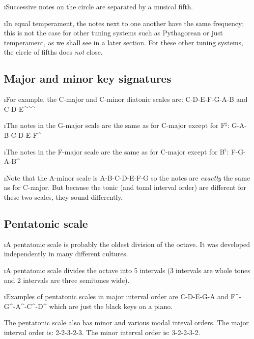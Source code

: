 \i Successive notes on the circle are separated by a musical fifth.

\i In equal temperament, the notes next to one another have the 
same frequency; 
this is not the case for other tuning systems such as Pythagorean
or just temperament, as we shall see in a later
section.
For these other tuning systems, the circle of fifths does {\em not}
close.

\ei
\subsection{Major and minor key signatures}
\bi

\i For example, the C-major and C-minor diatonic scales are:
\be
{\rm C-D-E-F-G-A-B}
\nonumber
\ee
% 
and
%
\be
{\rm C-D-E}^^^\sharp
\nonumber
\ee

\i The notes in the G-major scale are the same as for C-major 
except for F$^\sharp$:
%
\be
{\rm G-A-B-C-D-E-F}^\sharp
\nonumber
\ee
% 

\i The notes in the F-major scale are the same as for C-major 
except for B$^\flat$:
%
\be
{\rm F-G-A-B}^
\nonumber
\ee
% 

\i Note that the A-minor scale is
%
\be
{\rm A-B-C-D-E-F-G}
\nonumber
\ee
% 
so the notes are {\em exactly} the same as for C-major.
But because the tonic (and tonal interval order) are 
different for these two scales, they sound differently.

\ei
\subsection{Pentatonic scale}
\bi

\i A pentatonic scale is probably the oldest 
division of the octave.
It was developed independently in many different cultures.

\i A pentatonic scale divides the octave into
5 intervals (3 intervals are whole tones and
2 intervals are three semitones wide).

\i Examples of pentatonic scales in major interval
order are
%
\be
{\rm C-D-E-G-A} 
\ee
%
and
%
\be
{\rm F{}^\sharp-G{}^\sharp-A{}^\sharp-C{}^\sharp-D{}^\sharp}
\ee
%
which are just the black keys on a piano.

\item
The pentatonic scale also has minor
and various modal inteval orders.
The major interval order is: 2-2-3-2-3.
The minor interval order is: 3-2-2-3-2.

